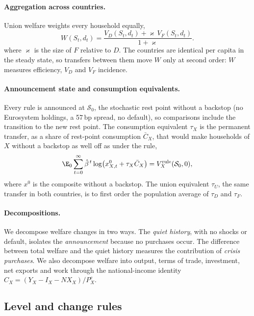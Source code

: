\paragraph{Aggregation across countries.}
Union welfare weights every household equally,
\begin{equation}
W(S_t,d_t)=\frac{V_D(S_t,d_t)+\varkappa\,V_F(S_t,d_t)}{1+\varkappa}.
\label{eq:union-welfare}
\end{equation}
where $\varkappa$ is the size of $F$ relative to $D$. The countries are identical per capita in the steady state, so transfers between them move $W$ only
at second order: $W$ measures efficiency, $V_D$ and $V_F$ incidence.

\paragraph{Announcement state and consumption equivalents.}
Every rule is announced at $\mathcal S_0$, the stochastic rest point without a backstop (no
Eurosystem holdings, a 57\,bp spread, no default), so comparisons include the transition to the new
rest point. The consumption equivalent $\tau_X$ is the permanent transfer, as a share of rest-point
consumption $\bar C_X$, that would make households of $X$ without a backstop as well off as under
the rule,
\begin{equation}
\E_0\sum_{t=0}^{\infty}\hat\beta^{\,t}\log\bigl(x^{0}_{X,t}+\tau_X\bar C_X\bigr)
=V^{\text{rule}}_X(\mathcal S_0,0),
\label{eq:ce}
\end{equation}
where $x^{0}$ is the composite without a backstop. The union equivalent $\tau_U$, the same transfer in
both countries, is to first order the population average of $\tau_D$ and $\tau_F$.

\paragraph{Decompositions.}
We decompose welfare changes in two ways. The \emph{quiet history}, with no shocks or default,
isolates the \emph{announcement} because no purchases occur. The difference between total welfare
and the quiet history measures the contribution of \emph{crisis purchases}. We also decompose welfare
into output, terms of trade, investment, net exports and work through the national-income identity
$C_X=(Y_X-I_X-NX_X)/P^{c}_X$.

\subsection{Level and change rules}
\label{sec:welfare-rules}

